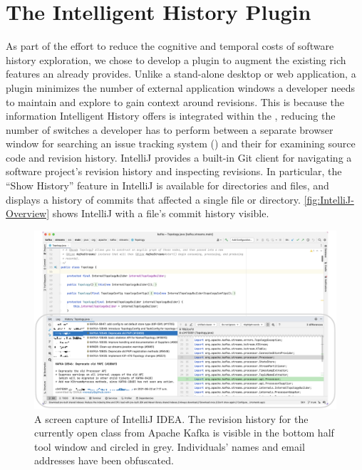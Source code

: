 \section{The Intelligent History Plugin}
\label{sec:Implementation}

As part of the effort to reduce the cognitive and temporal costs of software history exploration, 
we chose to develop a plugin to augment the existing rich features an  already provides.
Unlike a stand-alone desktop or web application, a plugin minimizes the number of external application windows a developer needs to maintain and explore to gain context around revisions. 
This is because the information  Intelligent History offers is integrated within the , 
reducing the number of switches a developer has to perform between a separate browser window for searching an issue tracking system ()
and their  for examining source code and revision history.
IntelliJ provides a built-in Git client  for navigating a software project's revision history and inspecting revisions. 
In particular, the ``Show History'' feature in IntelliJ is available for directories and files, 
and displays a history of commits that affected a single file or directory.
\autoref{fig:IntelliJ-Overview} shows IntelliJ with a file's commit history visible.

\begin{figure}
    \includegraphics[width=\textwidth]{./images/intellij-overview.png}
    \caption{
        A screen capture of IntelliJ IDEA. 
        The revision history for the currently open  class 
        from Apache Kafka is visible in the bottom half tool window and circled in grey.
        Individuals' names and email addresses have been obfuscated.
    }
    \label{fig:IntelliJ-Overview}
\end{figure}

